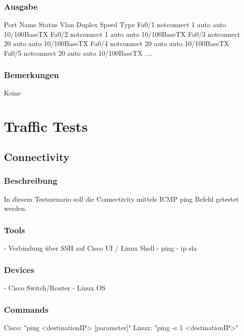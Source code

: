 \documentclass[a4,12pt]{scrartcl}
\begin{document}
\subsubsection{Ausgabe}
Port      Name               Status       Vlan       Duplex  Speed Type
Fa0/1                        notconnect   1            auto   auto 10/100BaseTX
Fa0/2                        notconnect   1            auto   auto 10/100BaseTX
Fa0/3                        notconnect   20           auto   auto 10/100BaseTX
Fa0/4                        notconnect   20           auto   auto 10/100BaseTX
Fa0/5                        notconnect   20           auto   auto 10/100BaseTX
....
\subsubsection{Bemerkungen}
Keine

























\newpage
\section{Traffic Tests}
\subsection{Connectivity}
\subsubsection{Beschreibung}
In diesem Testszenario soll die Connectivity mittels ICMP ping Befehl getestet werden.
\subsubsection{Tools}
- Verbindung über SSH auf Cisco UI / Linux Shell
- ping
- ip sla

\subsubsection{Devices}
- Cisco Switch/Router
- Linux OS
\subsubsection{Commands}
Cisco: "ping <destinationIP> [parameter]"
Linux: "ping -c 1 <destinationIP>"
\end{document}
